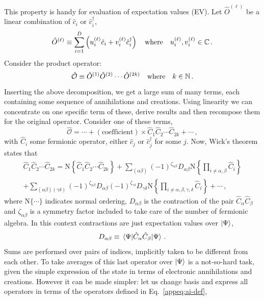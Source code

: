 This property is handy for evaluation of expectation values (EV). Let $\hat O^{(\ell)}$ be a linear combination of $\hat c_i$ or $\hat c_i^\dagger$,
\begin{equation}\label{appeq:slater-Ol}
	\hat O^{(\ell)} \equiv \sum_{i=1}^D \left(u_i^{(\ell)} \hat c_i + v_i^{(\ell)} \hat c_i^\dagger\right)
	\qq{where}
	u_i^{(\ell)}, v_i^{(\ell)} \in \mathbb{C} \, .
\end{equation}
Consider the product operator:
\[
	\hat{\mathcal{O}} \equiv \hat O^{(1)} \hat O^{(2)} \cdots \hat O^{(2k)}
	\qq{where}
	k \in \mathbb{N} \, .
\]
Inserting the above decomposition, we get a large sum of many terms, each containing some sequence of annihilations and creations. Using linearity we can concentrate on one specific term of these, derive results and then recompose them for the original operator. Consider one of these terms,
\[
	\hat{\mathcal{O}} = \cdots + (\text{coefficient}) \times \hat C_1 \hat C_2 \cdots \hat C_{2k} + \cdots \, ,
\]
with $\hat C_i$ some fermionic operator, either $\hat c_j$ or $\hat c_j^\dagger$ for some $j$. Now, Wick's theorem states that
\begin{multline}\label{appeq:wick-general}
	\hat C_1 \hat C_2 \cdots \hat C_{2k} = \mathrm{N} \left\lbrace \hat C_1 \hat C_2 \cdots \hat C_{2k} \right\rbrace + \sum_{(\alpha\beta)} (-1)^{\zeta_{\alpha\beta}} D_{\alpha\beta} \mathrm{N} \left\lbrace \prod_{i \neq \alpha,\beta} \hat C_i \right\rbrace \\
	+ \sum_{(\alpha\beta)(\gamma\delta)} (-1)^{\zeta_{\alpha\beta}} D_{\alpha\beta} (-1)^{\zeta_{\gamma\delta}} D_{\gamma\delta} \mathrm{N} \left\lbrace \prod_{i \neq \alpha,\beta,\gamma,\delta} \hat C_i \right\rbrace + \cdots \, ,
\end{multline}
where $\mathrm{N}\lbrace \cdots \rbrace$ indicates normal ordering, $D_{\alpha\beta}$ is the contraction of the pair $\hat C_\alpha \hat C_\beta$ and $\zeta_{\alpha\beta}$ is a symmetry factor included to take care of the number of fermionic algebra. In this context contractions are just expectation values over $\ket{\Psi}$,
\[
	D_{\alpha\beta} \equiv \mel{\Psi}{\hat C_\alpha \hat C_\beta}{\Psi} \, .
\]
Sums are performed over pairs of indices, implicitly taken to be different from each other. To take averages of this last operator over $\ket{\Psi}$ is a not-so-hard task, given the simple expression of the state in terms of electronic annihilations and creations. However it can be made simpler: let us change basis and express all operators in terms of the operators defined in Eq.~\eqref{appeq:ai-def},
